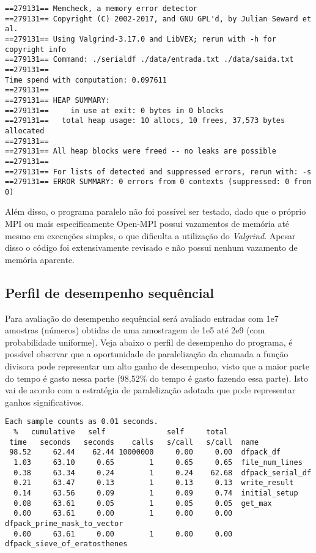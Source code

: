 \documentclass{article}
\begin{document}
\begin{verbatim}
==279131== Memcheck, a memory error detector
==279131== Copyright (C) 2002-2017, and GNU GPL'd, by Julian Seward et al.
==279131== Using Valgrind-3.17.0 and LibVEX; rerun with -h for copyright info
==279131== Command: ./serialdf ./data/entrada.txt ./data/saida.txt
==279131== 
Time spend with computation: 0.097611
==279131== 
==279131== HEAP SUMMARY:
==279131==     in use at exit: 0 bytes in 0 blocks
==279131==   total heap usage: 10 allocs, 10 frees, 37,573 bytes allocated
==279131== 
==279131== All heap blocks were freed -- no leaks are possible
==279131== 
==279131== For lists of detected and suppressed errors, rerun with: -s
==279131== ERROR SUMMARY: 0 errors from 0 contexts (suppressed: 0 from 0)
\end{verbatim}

Além disso, o programa paralelo não foi possível ser testado, dado que o próprio MPI ou mais especificamente Open-MPI possui vazamentos de memória até mesmo em execuções simples, o que dificulta a utilização do \textit{Valgrind}. Apesar disso o código foi extensivamente revisado e não possui nenhum vazamento de memória aparente.

\subsection{Perfil de desempenho sequêncial}

Para avaliação do desempenho sequêncial será avaliado entradas com 1e7 amostras (números) obtidas de uma amostragem de 1e5 até 2e9 (com probabilidade uniforme). Veja abaixo o perfil de desempenho do programa, é possível observar que a oportunidade de paralelização da chamada a função divisora pode representar um alto ganho de desempenho, visto que a maior parte do tempo é gasto nessa parte (98,52\% do tempo é gasto fazendo essa parte). Isto vai de acordo com a estratégia de paralelização adotada que pode representar ganhos significativos.

\begin{verbatim}
Each sample counts as 0.01 seconds.
  %   cumulative   self              self     total           
 time   seconds   seconds    calls   s/call   s/call  name    
 98.52     62.44    62.44 10000000     0.00     0.00  dfpack_df
  1.03     63.10     0.65        1     0.65     0.65  file_num_lines
  0.38     63.34     0.24        1     0.24    62.68  dfpack_serial_df
  0.21     63.47     0.13        1     0.13     0.13  write_result
  0.14     63.56     0.09        1     0.09     0.74  initial_setup
  0.08     63.61     0.05        1     0.05     0.05  get_max
  0.00     63.61     0.00        1     0.00     0.00  dfpack_prime_mask_to_vector
  0.00     63.61     0.00        1     0.00     0.00  dfpack_sieve_of_eratosthenes
\end{verbatim}
\end{document}
